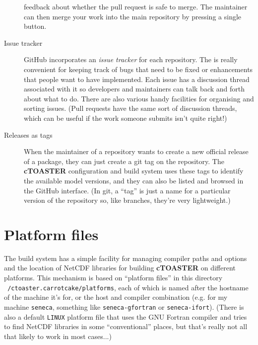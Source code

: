 \documentclass[a4paper,10pt,article]{memoir}
\begin{document}
\begin{description}
{    feedback about whether the pull request is safe to merge.  The
    maintainer can then merge your work into the main repository by
    pressing a single button.}
  \item[Issue tracker]{GitHub incorporates an \emph{issue tracker} for
    each repository.  The is really convenient for keeping track of
    bugs that need to be fixed or enhancements that people want to
    have implemented.  Each issue has a discussion thread associated
    with it so developers and maintainers can talk back and forth
    about what to do.  There are also various handy facilities for
    organising and sorting issues.  (Pull requests have the same sort
    of discussion threads, which can be useful if the work someone
    submits isn't quite right!)}
  \item[Releases as tags]{When the maintainer of a repository wants to
    create a new official release of a package, they can just create a
    git tag on the repository.  The \textbf{cTOASTER} configuration and build
    system uses these tags to identify the available model versions,
    and they can also be listed and browsed in the GitHub interface.
    (In git, a ``tag'' is just a name for a particular version of the
    repository so, like branches, they're very lightweight.)}
\end{description}

\section{Platform files}
\label{sec:platforms}

The build system has a simple facility for managing compiler paths and
options and the location of NetCDF libraries for building \textbf{cTOASTER} on
different platforms.  This mechanism is based on ``platform files'' in
this directory \texttt{~/ctoaster.carrotcake/platforms}, each of which is named
after the hostname of the machine it's for, or the host and compiler
combination (e.g. for my machine \texttt{seneca}, something like
\texttt{seneca-gfortran} or \texttt{seneca-ifort}).  (There is also a
default \texttt{LINUX} platform file that uses the GNU Fortran
compiler and tries to find NetCDF libraries in some ``conventional''
places, but that's really not all that likely to work in most
cases...)
\end{document}
